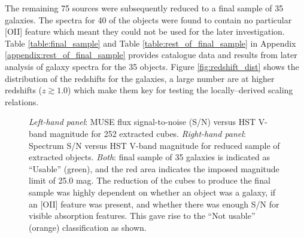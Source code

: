 \documentclass[12pt, twocolumn, nofootinbib]{revtex4-1}    %
\begin{document}
The remaining 75 sources were subsequently reduced to a final sample of 35 galaxies. The spectra for 40 of the objects were found to contain no particular [OII] feature which meant they could not be used for the later investigation. Table \ref{table:final_sample} and Table \ref{table:rest_of_final_sample} in Appendix \ref{appendix:rest_of_final_sample} provides catalogue data and results from later analysis of galaxy spectra for the 35 objects. Figure \ref{fig:redshift_dist} shows the distribution of the redshifts for the galaxies, a large number are at higher redshifts ($z\gtrsim1.0$) which make them key for testing the locally--derived scaling relations.  

\begin{figure}
  \caption[HUDF Objects]{\textit{Left-hand panel}: MUSE flux signal-to-noise (S/N) versus HST V-band magnitude for 252 extracted cubes. \textit{Right-hand panel}: Spectrum S/N versus HST V-band magnitude for reduced sample of extracted objects. \textit{Both}: final sample of 35 galaxies is indicated as ``Usable'' (green), and the red area indicates the imposed magnitude limit of 25.0 mag. The reduction of the cubes to produce the final sample was highly dependent on whether an object was a galaxy, if an [OII] feature was present, and whether there was enough S/N for visible absorption features. This gave rise to the ``Not usable'' (orange) classification as shown.}
\label{fig:sn_vband}
\end{figure}
\end{document}
